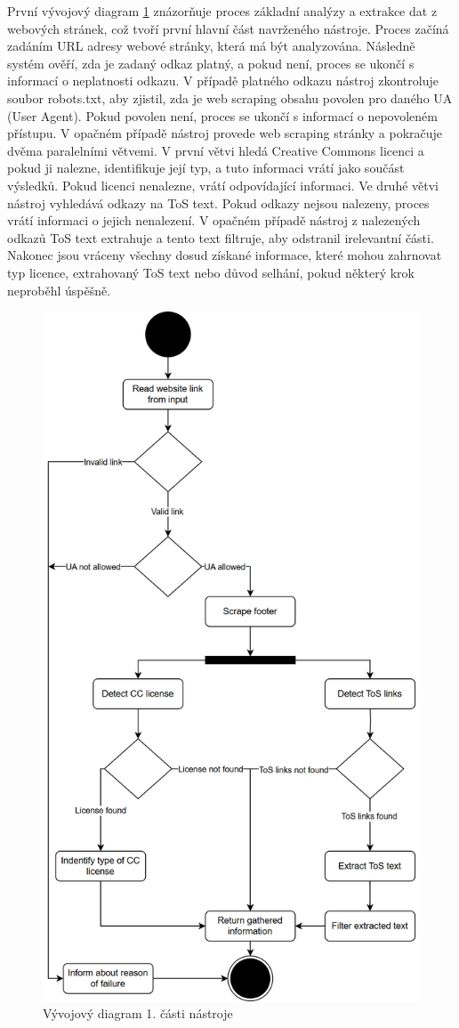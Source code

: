 První vývojový diagram \ref{fig:flowchart1} znázorňuje proces základní analýzy a extrakce dat z webových stránek, což tvoří první hlavní část navrženého nástroje.
Proces začíná zadáním URL adresy webové stránky, která má být analyzována.
Následně systém ověří, zda je zadaný odkaz platný, a pokud není, proces se ukončí s informací o neplatnosti odkazu.
V případě platného odkazu nástroj zkontroluje soubor robots.txt, aby zjistil, zda je web scraping obsahu povolen pro daného UA (User Agent).
Pokud povolen není, proces se ukončí s informací o nepovoleném přístupu.
V opačném případě nástroj provede web scraping stránky a pokračuje dvěma paralelními větvemi.
V první větvi hledá Creative Commons licenci a pokud ji nalezne, identifikuje její typ, a tuto informaci vrátí jako součást výsledků.
Pokud licenci nenalezne, vrátí odpovídající informaci.
Ve druhé větvi nástroj vyhledává odkazy na ToS text.
Pokud odkazy nejsou nalezeny, proces vrátí informaci o jejich nenalezení. V opačném případě nástroj z nalezených odkazů ToS text extrahuje a tento text filtruje, aby odstranil irelevantní části.
Nakonec jsou vráceny všechny dosud získané informace, které mohou zahrnovat typ licence, extrahovaný ToS text nebo důvod selhání, pokud některý krok neproběhl úspěšně.

\begin{figure}[H]
    \centering
    \includegraphics[width=0.8\linewidth]{images/flowchart1}
    \caption{Vývojový diagram 1. části nástroje}
    \label{fig:flowchart1}
\end{figure}

